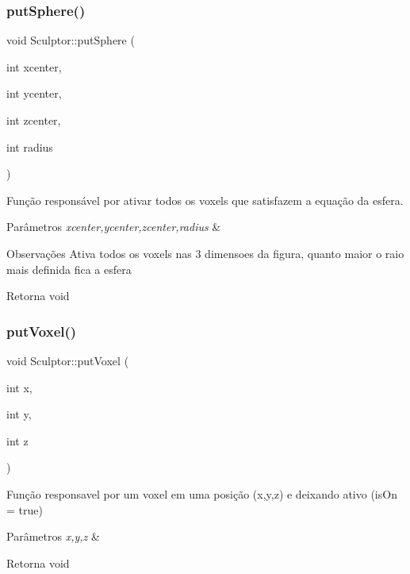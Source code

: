 \subsubsection{\texorpdfstring{put\+Sphere()}{putSphere()}}
{\footnotesize\ttfamily void Sculptor\+::put\+Sphere (\begin{DoxyParamCaption}\item[{int}]{xcenter,  }\item[{int}]{ycenter,  }\item[{int}]{zcenter,  }\item[{int}]{radius }\end{DoxyParamCaption})}



Função responsável por ativar todos os voxels que satisfazem a equação da esfera. 


\begin{DoxyParams}{Parâmetros}
{\em xcenter,ycenter,zcenter,radius} & \\
\hline
\end{DoxyParams}
\begin{DoxyRemark}{Observações}
Ativa todos os voxels nas 3 dimensoes da figura, quanto maior o raio mais definida fica a esfera 
\end{DoxyRemark}
\begin{DoxyReturn}{Retorna}
void 
\end{DoxyReturn}
\mbox{\label{class_sculptor_a4bdea3048b419d58e93074060eaa7b52}} 
\subsubsection{\texorpdfstring{put\+Voxel()}{putVoxel()}}
{\footnotesize\ttfamily void Sculptor\+::put\+Voxel (\begin{DoxyParamCaption}\item[{int}]{x,  }\item[{int}]{y,  }\item[{int}]{z }\end{DoxyParamCaption})}



Função responsavel por um voxel em uma posição (x,y,z) e deixando ativo (is\+On = true) 


\begin{DoxyParams}{Parâmetros}
{\em x,y,z} & \\
\hline
\end{DoxyParams}
\begin{DoxyReturn}{Retorna}
void 
\end{DoxyReturn}
\mbox{\label{class_sculptor_a4e53f85ee03b729efafa985f72563c4b}} 
